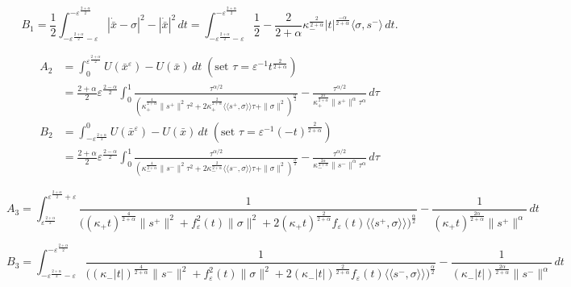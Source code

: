 \documentclass[11pt]{amsart}
\newcommand{\al}{\alpha}
\newcommand{\ep}{\varepsilon}
\newcommand{\sg}{\sigma}
\newcommand{\kp}{\kappa}
\newcommand{\ey}{\frac{1}{2}}
\newcommand{\pwa}{\frac{2}{2+\al}}
\newcommand{\pwb}{\frac{2 +\al}{2}}
\newcommand{\xb}{\bar{x}}
\def\me#1{\langle\!\langle #1 \rangle\!\rangle}
\theoremstyle{plain}
\theoremstyle{definition}
\theoremstyle{remark}
\begin{document}
\begin{equation}
\label{eq;B1}B_1  = \ey \int^{-\ep^{\pwb}}_{-\ep^{\pwb}-\ep} |\dot{\xb} - \sg|^2 - |\dot{\xb}|^2 \,dt = \int^{-\ep^{\pwb}}_{-\ep^{\pwb}-\ep} \ey - \pwa \kp_-^{\pwa} |t|^{\frac{-\al}{2 +\al}} \langle \sg, s^- \rangle \,dt. 
\end{equation}


\begin{equation}
\label{eq;A2} \begin{aligned}
A_2 &= \int_{0}^{\ep^{\pwb}} U(\xb^{\ep})  - U(\xb) \,dt \;  (\text{set } \tau = \ep^{-1} t^{\pwa}) \\
& = \frac{2+\al}{2} \ep^{\frac{2 -\al}{2}} \int_0^1 \frac{\tau^{\al/2}}{\left( \kp_+^{\frac{4}{2+\al}} \|s^+\|^2 \tau^2 + 2 \kp_+^{\pwa} \me{s^+, \sg} \tau +\|\sg\|^2 \right)^{\frac{\al}{2}}} - \frac{\tau^{\al/2}}{\kp_+^{\frac{2\al}{2 +\al}} \|s^+\|^{\al} \tau^{\al}} \,d\tau
\end{aligned}
\end{equation}
\begin{equation}
\label{eq;B2} \begin{aligned}
B_2 &= \int^{0}_{-\ep^{\pwb}} U(\xb^{\ep})  - U(\xb) \,dt \;  (\text{set } \tau = \ep^{-1} (-t)^{\pwa}) \\
& = \frac{2+\al}{2} \ep^{\frac{2 -\al}{2}} \int_0^1 \frac{\tau^{\al/2}}{\left( \kp_-^{\frac{4}{2+\al}} \|s^-\|^2 \tau^2 + 2 \kp_-^{\pwa} \me{s^-, \sg} \tau +\|\sg\|^2 \right)^{\frac{\al}{2}}} - \frac{\tau^{\al/2}}{\kp_-^{\frac{2\al}{2 +\al}} \|s^-\|^{\al} \tau^{\al}} \,d\tau
\end{aligned}
\end{equation}


\begin{equation}
\label{eq;A3}   A_3  =  \int_{\ep^{\pwb}}^{\ep^{\pwb}+\ep} \frac{1}{\Big( (\kp_+ t)^{\frac{4}{2 +\al}} \|s^+\|^2 + f_{\ep}^2(t) \|\sg\|^2 + 2 (\kp_+ t)^{\pwa} f_{\ep}(t) \me{s^+, \sg}  \Big)^{\frac{\al}{2}} } - \frac{1}{(\kp_+ t)^{\frac{2\al}{2 +\al}} \|s^+\|^{\al}} \,dt
\end{equation}

\begin{equation}
\label{eq;B3}   B_3  =  \int^{-\ep^{\pwb}}_{-\ep^{\pwb}-\ep} \frac{1}{\Big( (\kp_- |t|)^{\frac{4}{2 +\al}} \|s^-\|^2 + f_{\ep}^2(t) \|\sg\|^2 + 2 (\kp_- |t|)^{\pwa} f_{\ep}(t) \me{s^-, \sg}  \Big)^{\frac{\al}{2}} } - \frac{1}{(\kp_- |t|)^{\frac{2\al}{2 +\al}} \|s^-\|^{\al}} \,dt
\end{equation}
\end{document}
